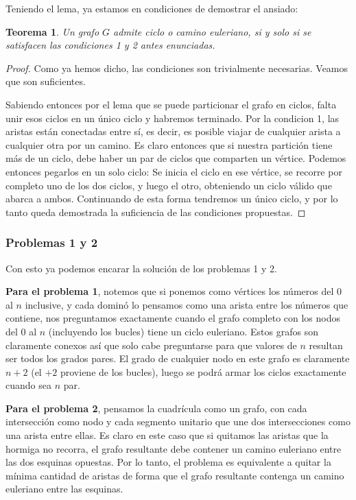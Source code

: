 \documentclass{article}
\newtheorem{teorema}{{\sc Teorema}}
\begin{document}
Teniendo el lema, ya estamos en condiciones de demostrar el ansiado:

\begin{teorema}
Un grafo $G$ admite ciclo o camino euleriano, si y solo si se satisfacen las condiciones 1 y 2 antes enunciadas.
\end{teorema}
\begin{proof}
Como ya hemos dicho, las condiciones son trivialmente necesarias. Veamos que son suficientes.

Sabiendo entonces por el lema que se puede particionar el grafo en ciclos, falta unir esos ciclos en un único ciclo y habremos terminado. 
Por la condicion 1, las aristas están conectadas entre sí, es decir, es posible viajar de cualquier arista a cualquier otra por un camino. 
Es claro entonces que si nuestra partición tiene más de un ciclo, debe haber un par de ciclos que comparten un vértice. 
Podemos entonces pegarlos en un solo ciclo: Se inicia el ciclo en ese vértice, se recorre por completo uno de los dos ciclos,
y luego el otro, obteniendo un ciclo válido que abarca a ambos. 
Continuando de esta forma tendremos un único ciclo, y por lo tanto queda demostrada la suficiencia de las condiciones propuestas.
\end{proof}

\subsubsection{Problemas 1 y 2}

Con esto ya podemos encarar la solución de los problemas 1 y 2.

\textbf{Para el problema 1}, notemos que si ponemos como vértices los números del 0 al $n$ inclusive, y cada dominó lo pensamos como una arista entre los números que contiene, nos preguntamos exactamente cuando el grafo completo con los nodos del 0 al $n$ (incluyendo los bucles) tiene un ciclo euleriano. Estos grafos son claramente conexos así que solo cabe preguntarse para que valores de $n$ resultan ser todos los grados pares. El grado de cualquier nodo en este grafo es claramente $n+2$ (el $+2$ proviene de los bucles), luego se podrá armar los ciclos exactamente cuando sea $n$ par.

\textbf{Para el problema 2}, pensamos la cuadrícula como un grafo, con cada intersección como nodo y cada segmento unitario que une dos intersecciones como una arista entre ellas. Es claro en este caso que si quitamos las aristas que la hormiga no recorra, el grafo resultante debe contener un camino euleriano entre las dos esquinas opuestas. Por lo tanto, el problema es equivalente a quitar la mínima cantidad de aristas de forma que el grafo resultante contenga un camino euleriano entre las esquinas.
\end{document}
